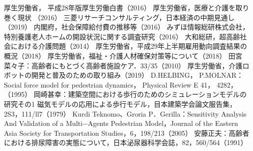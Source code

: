 \begin{thebibliography}{99}
  厚生労働省， 平成28年版厚生労働白書（2016）
  厚生労働省，医療と介護を取り巻く現状 （2016）
  三菱リサーチコンサルティング，日本経済の中期見通し（2019）
  内閣府，社会保障給付費の推移等（2016）
  みずほ情報総研株式会社，特別養護老人ホームの開設状況に関する調査研究（2016）
  大和総研，超高齢社会における介護問題（2014）
  厚生労働省，平成29年上半期雇用動向調査結果の概況（2018）
  厚生労働省，福祉・介護人材確保対策等について（2018）
  田宮菜々子：高齢者にもとづく高齢者施設ケア．33/35（2010）
  厚生労働省，介護ロボットの開発と普及のための取り組み（2019）
  D.HELBING， P.MOLNAR：Social force model for pedestrian dynamics， Physical Review E 41， 4282，（1995）
  岡崎甚幸：建築空間における歩行のためのシミュレーションモデルの研究その1 磁気モデルの応用による歩行モデル，目本建築学会論文服告集，2S3，111/ll7（1979）
  Kurdi Teknomo、Groria P．Gerilla：Sensitivity Analysis And Validation of a Multi−Agents Pedestrian Model，Journal of the Eastern Asia Society for Transportation Studies，6，198/213（2005）
  安藤正夫：高齢者における排尿障害の実態について，日本泌尿器科学会誌，82，560/564（1991）
\end{thebibliography}
